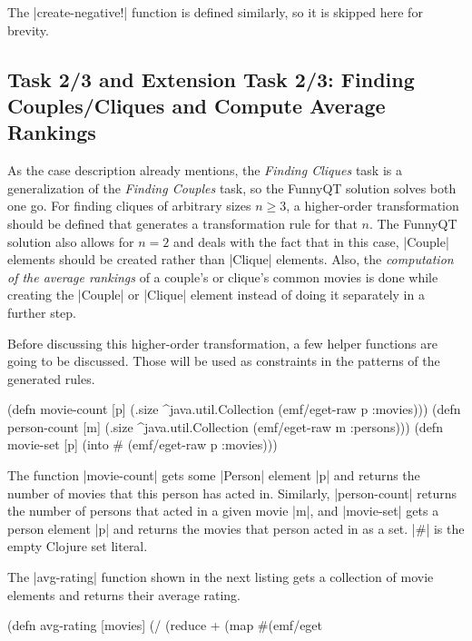 \documentclass[submission]{eptcs}
\newcommand{\code}{\clojureinline}
\begin{document}
The \code|create-negative!| function is defined similarly, so it is skipped
here for brevity.


\subsection{Task 2/3 and Extension Task 2/3: Finding Couples/Cliques and
  Compute Average Rankings}
\label{sec:task-2:finding-groups}

As the case description already mentions, the \emph{Finding Cliques} task is a
generalization of the \emph{Finding Couples} task, so the FunnyQT solution
solves both one go.  For finding cliques of arbitrary sizes \(n \geq 3\),
a higher-order transformation should be defined that generates a transformation
rule for that \(n\).
The FunnyQT solution also allows for \(n = 2\)
and deals with the fact that in this case, \code|Couple| elements should be
created rather than \code|Clique| elements.  Also, the \emph{computation of the
  average rankings} of a couple's or clique's common movies is done while
creating the \code|Couple| or \code|Clique| element instead of doing it
separately in a further step.

Before discussing this higher-order transformation, a few helper functions are
going to be discussed.  Those will be used as constraints in the patterns of
the generated rules.

\begin{clojurecode}
(defn movie-count [p]
  (.size ^java.util.Collection (emf/eget-raw p :movies)))
(defn person-count [m]
  (.size ^java.util.Collection (emf/eget-raw m :persons)))
(defn movie-set [p]
  (into #{} (emf/eget-raw p :movies)))
\end{clojurecode}

The function \code|movie-count| gets some \code|Person| element \code|p| and
returns the number of movies that this person has acted in.  Similarly,
\code|person-count| returns the number of persons that acted in a given movie
\code|m|, and \code|movie-set| gets a person element \code|p| and returns the
movies that person acted in as a set.  \code|#{}| is the empty Clojure set
literal.

The \code|avg-rating| function shown in the next listing gets a collection of
movie elements and returns their average rating.

\begin{clojurecode}
(defn avg-rating [movies]
  (/ (reduce + (map #(emf/eget %
\end{clojurecode}
\end{document}
